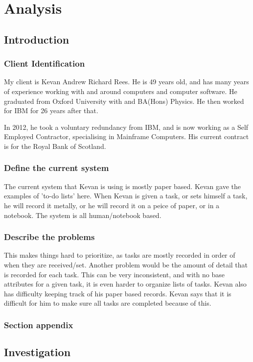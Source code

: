 \chapter{Analysis}

\section{Introduction}

\subsection{Client Identification}
My client is Kevan Andrew Richard Rees. He is 49 years old, and has many years of experience working with and around computers and computer software. He graduated from Oxford University with and BA(Hons) Physics. He then worked for IBM for 26 years after that. 

In 2012, he took a voluntary redundancy from IBM, and is now working as a Self Employed Contractor, specialising in Mainframe Computers. His current contract is for the Royal Bank of Scotland.
\subsection{Define the current system}
The current system that Kevan is using is mostly paper based. Kevan gave the examples of 'to-do lists' here. When Kevan is given a task, or sets himself a task, he will record it metally, or he will record it on a peice of paper, or in a notebook. The system is all human/notebook based.
\subsection{Describe the problems}
This makes things hard to prioritize, as tasks are mostly recorded in order of when they are received/set. Another problem would be the amount of detail that is recorded for each task. This can be very inconsistent, and with no base attributes for a given task, it is even harder to organize lists of tasks. Kevan also has difficulty keeping track of his paper based records. Kevan says that it is difficult for him to make sure all tasks are completed because of this.
\subsection{Section appendix}

\section{Investigation}

